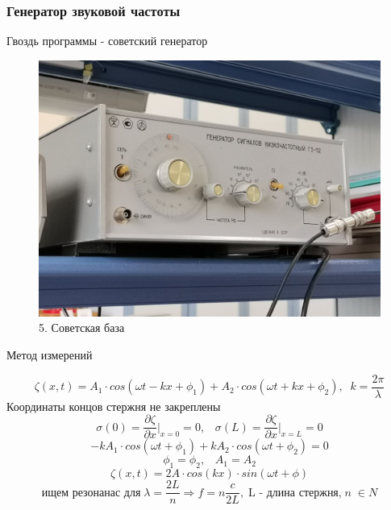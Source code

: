 \documentclass[xcolor=table]{beamer}
\begin{document}
\begin{frame}
\frametitle{Генератор звуковой частоты}
\large Гвоздь программы - советский генератор
\begin{figure}
    \centering
    \includegraphics[scale=0.2]{images/soviet_base.jpg}
    \caption{5. Советская база}
    \label{fig:my_label}
\end{figure}
\end{frame}

\begin{frame}{Метод измерений}
    \begin{spacing}{0.25}
    $$ \zeta (x, t) = A_1\cdot cos(\omega t - kx + \phi_1) + A_2\cdot cos(\omega t + kx + \phi_2), \;\; k = \frac{2\pi}{\lambda}$$
    Координаты концов стержня не закреплены 
    $$\sigma(0) = \frac{\partial \zeta}{\partial x}\bigg|_{x=0} = 0, \;\;\; \sigma(L) = \frac{\partial \zeta}{\partial x}\bigg|_{x=L} = 0$$
    $$-kA_1\cdot cos(\omega t + \phi_1) + kA_2\cdot cos(\omega t + \phi_2) = 0$$
    $$\phi_1 = \phi_2, \;\;\; A_1 = A_2$$
    $$\zeta(x,t) = 2A\cdot cos(kx) \cdot sin(\omega t + \phi)$$
    $$\text{ищем резонанас для}\; \lambda = \frac{2L}{n} \Rightarrow f = n\frac{c}{2L}, \;\text{L - длина стержня,} \; n \; \in N$$
    \end{spacing}
\end{frame}
\end{document}
